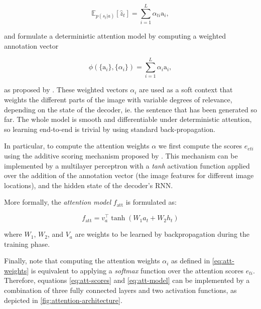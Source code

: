 $$\mathbb{E}_{p(s_t|a)}[\hat{z}_t] = \sum_{i=1}^L \alpha_{ti}\text{a}_i,$$

and formulate a deterministic attention model by computing a weighted annotation vector

\begin{equation}\label{eq:att-context-2}
\phi(\{\text{a}_i\}, \{\alpha_i\}) = \sum_{i=1}^L \alpha_i\text{a}_i,
\end{equation}

as proposed by \citet{Bahdanau2015}. These weighted vectors $\alpha_i$ are used as a soft context that weights the different parts of the image with variable degrees of relevance, depending on the state of the decoder, ie. the sentence that has been generated so far. The whole model is smooth and differentiable under deterministic attention, so learning end-to-end is trivial by using standard back-propagation.

In particular, to compute the attention weights $\alpha$ we first compute the scores $e_{eti}$ using the additive scoring mechanism proposed by \citep{Bahdanau2015}. This mechanism can be implemented by a multilayer perceptron with a \textit{tanh} activation function applied over the addition of the annotation vector (the image features for different image locations), and the hidden state of the decoder's RNN.

More formally, the \textit{attention model} $f_\text{att}$ is formulated as:

\begin{equation}\label{eq:att-model}
f_\text{att} = v_a^{\top} \tanh(W_1 a_t + W_2 h_{t})
\end{equation}

where $W_1$, $W_2$, and $V_a$ are weights to be learned by backpropagation during the training phase. 

Finally, note that computing the attention weights $\alpha_i$ as defined in \cref{eq:att-weights} is equivalent to applying a \textit{softmax} function over the attention scores $e_{ti}$. Therefore, equations \cref{eq:att-scores} and \cref{eq:att-model} can be implemented by a combination of three fully connected layers and two activation functions, as depicted in \cref{fig:attention-architecture}.

